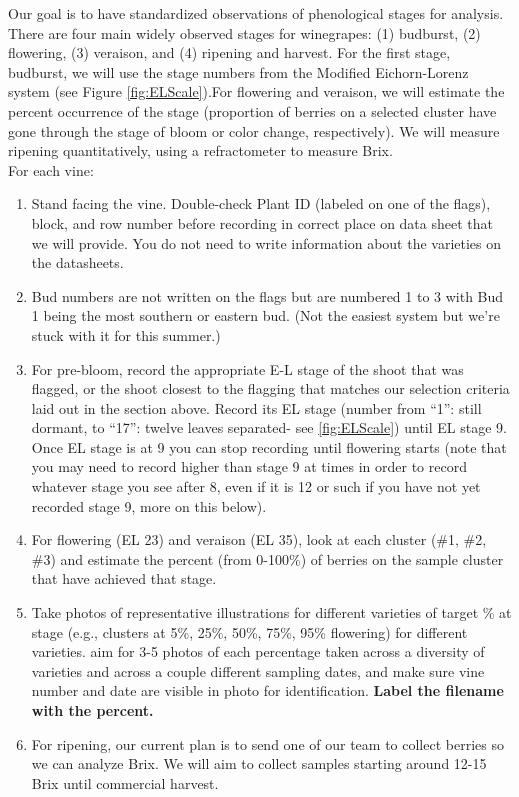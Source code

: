 \documentclass[11pt,letter]{article}
\begin{document}
Our goal is to have standardized observations of phenological stages for analysis. There are four main widely observed stages for winegrapes: (1) budburst, (2) flowering, (3) veraison, and (4) ripening and harvest. For the first stage, budburst, we will use the stage numbers from the Modified Eichorn-Lorenz system (see Figure \ref{fig:ELScale}).For flowering and veraison, we will estimate the percent occurrence of the stage (proportion of berries on a selected cluster have gone through the stage of bloom or color change, respectively). We will measure ripening quantitatively, using a refractometer to measure Brix. \\

For each vine:
\begin{enumerate}
	\item Stand facing the vine. Double-check Plant ID (labeled on one of the flags), block, and row number before recording in correct place on data sheet that we will provide. You do not need to write information about the varieties on the datasheets.
	\item Bud numbers are not written on the flags but are numbered 1 to 3 with Bud 1 being the most southern or eastern bud. (Not the easiest system but we're stuck with it for this summer.)
	\item For pre-bloom, record the appropriate E-L stage of the shoot that was flagged, or the shoot closest to the flagging that matches our selection criteria laid out in the section above. Record its EL stage (number from “1”: still dormant, to “17”: twelve leaves separated- see \ref{fig:ELScale}) until EL stage 9. Once EL stage is at 9 you can stop recording until flowering starts (note that you may need to record higher than stage 9 at times in order to record whatever stage you see after 8, even if it is 12 or such if you have not yet recorded stage 9, more on this below).
	\item  For flowering (EL 23) and veraison (EL 35), look at each cluster (\#1, \#2, \#3) and estimate the percent (from 0-100\%) of berries on the sample cluster that have achieved that stage. 
	\item Take photos of representative illustrations for different varieties of target \% at stage (e.g., clusters at 5\%, 25\%, 50\%, 75\%, 95\% flowering) for different varieties. aim for 3-5 photos of each percentage taken across a diversity of varieties and across a couple different sampling dates, and make sure vine number and date are visible in photo for identification. {\bf Label the filename with the percent.}
	\item For ripening, our current plan is to send one of our team to collect berries so we can analyze Brix. We will aim to collect samples starting around 12-15 Brix until commercial harvest. %

\end{enumerate}
\end{document}
